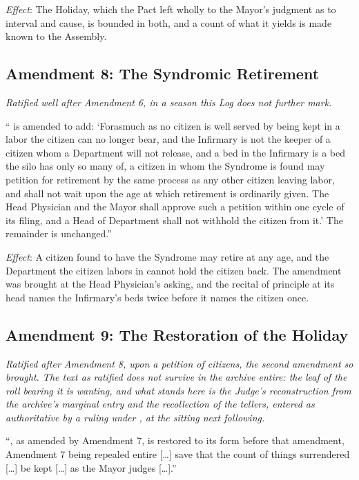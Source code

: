\textit{Effect}: The Holiday, which the Pact left wholly to the Mayor's judgment as to interval and cause, is bounded in both, and a count of what it yields is made known to the Assembly.

\subsection*{Amendment 8: The Syndromic Retirement}

\textit{Ratified well after Amendment 6, in a season this Log does not further mark.}

`` is amended to add: `Forasmuch as no citizen is well served by being kept in a labor the citizen can no longer bear, and the Infirmary is not the keeper of a citizen whom a Department will not release, and a bed in the Infirmary is a bed the silo has only so many of, a citizen in whom the Syndrome is found may petition for retirement by the same process as any other citizen leaving labor, and shall not wait upon the age at which retirement is ordinarily given. The Head Physician and the Mayor shall approve such a petition within one cycle of its filing, and a Head of Department shall not withhold the citizen from it.' The remainder is unchanged.''

\textit{Effect}: A citizen found to have the Syndrome may retire at any age, and the Department the citizen labors in cannot hold the citizen back. The amendment was brought at the Head Physician's asking, and the recital of principle at its head names the Infirmary's beds twice before it names the citizen once.

\subsection*{Amendment 9: The Restoration of the Holiday}

\textit{Ratified after Amendment 8, upon a petition of citizens, the second amendment so brought. The text as ratified does not survive in the archive entire: the leaf of the roll bearing it is wanting, and what stands here is the Judge's reconstruction from the archive's marginal entry and the recollection of the tellers, entered as authoritative by a ruling under , at the sitting next following.}

``, as amended by Amendment 7, is restored to its form before that amendment, Amendment 7 being repealed entire [\ldots] save that the count of things surrendered [\ldots] be kept [\ldots] as the Mayor judges [\ldots].''

